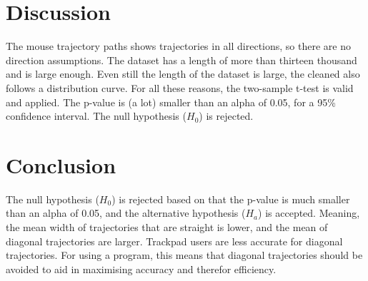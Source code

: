 \section*{Discussion}
The mouse trajectory paths shows trajectories in all directions, so there are no direction assumptions. The dataset has a length of more than thirteen thousand and is large enough. Even still the length of the dataset is large, the cleaned also follows a distribution curve. For all these reasons, the two-sample t-test is valid and applied. The p-value is (a lot) smaller than an alpha of 0.05, for a 95\% confidence interval. The null hypothesis ($𝐻_0$) is rejected.

\section*{Conclusion}
The null hypothesis ($𝐻_0$) is rejected based on that the p-value is much smaller than an alpha of 0.05, and the alternative hypothesis ($𝐻_𝑎$) is accepted. Meaning, the mean width of trajectories that are straight is lower, and the mean of diagonal trajectories are larger. Trackpad users are less accurate for diagonal trajectories. For using a program, this means that diagonal trajectories should be avoided to aid in maximising accuracy and therefor efficiency. 
